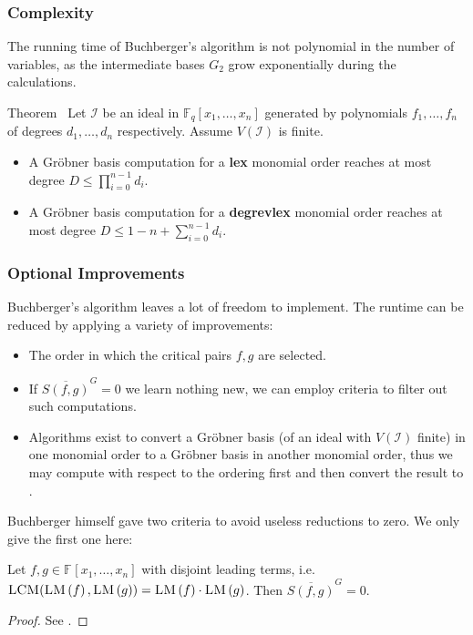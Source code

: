 \documentclass[9pt]{beamer}
\newcommand{\memph}[1]{{\color{yellow9}{\bf #1}}\xspace}
\newcommand{\F}[1][]{\ensuremath{\mathbb{F}_{#1}}\xspace}
\newcommand{\I}{\ensuremath{\mathcal{I}}\xspace}
\newcommand{\gens}{\ensuremath{x_1,\dots,x_{n}}\xspace}
\newcommand{\LM}[1]{\ensuremath{\textsc{LM}\left(#1\right)}\xspace}
\newcommand{\LCM}[1]{\ensuremath{\textsc{LCM}(#1)\xspace}}
\begin{document}
\begin{frame}
\frametitle{Complexity}

The running time of Buchberger's algorithm is not polynomial in the number of variables, as the intermediate bases $G_2$ grow exponentially during the calculations.

\begin{block}{Theorem~\cite{faugere-ars:inria2004}}
Let $\I$ be an ideal in $\F[q][\gens]$ generated by polynomials $f_1,\dots,f_n$ of degrees $d_1,\dots,d_n$ respectively. Assume $V(\I)$ is finite.
\begin{itemize}
 \item A Gröbner basis computation for a \textbf{lex} monomial order reaches at most degree $D \leq \prod_{i=0}^{n-1} d_i$.
 \item A Gröbner basis computation for a \textbf{degrevlex} monomial order reaches at most degree $D \leq 1 - n + \sum_{i=0}^{n-1} d_i$.
\end{itemize}
\end{block}
\end{frame}

\begin{frame}[allowframebreaks]
\frametitle{Optional Improvements}
Buchberger's algorithm leaves a lot of freedom to implement. The runtime can be reduced by applying a variety of improvements:
\begin{itemize}
\item The order in which the critical pairs $f,g$  are selected.
\item If $\overline{S(f,g)}^G = 0$ we learn nothing new, we can employ criteria to filter out such computations.
\item Algorithms exist \cite{faugere-gianni-lazard-mora:joc1993} to convert a Gröbner basis (of an ideal with $V(\I)$ finite) in one monomial order to a Gröbner basis in another monomial order, thus we may compute with respect to the \memph{degrevlex} ordering first and then convert the result to \memph{lex}.
\end{itemize}

\framebreak

Buchberger himself gave two criteria to avoid useless reductions to zero. We only give the first one here:

\begin{definition}
Let $f,g \in \F{}[\gens]$ with disjoint leading terms, i.e.\ $\LCM{\LM{f},\LM{g}} = \LM{f}\cdot\LM{g}$. Then $\overline{S(f,g)}^G = 0$.
\label{def:buchberger_first_criterion}
\end{definition}

\begin{proof}
See \cite[p.222]{becker-weispfenning:1991}. 
\end{proof}

\end{frame}
\end{document}
